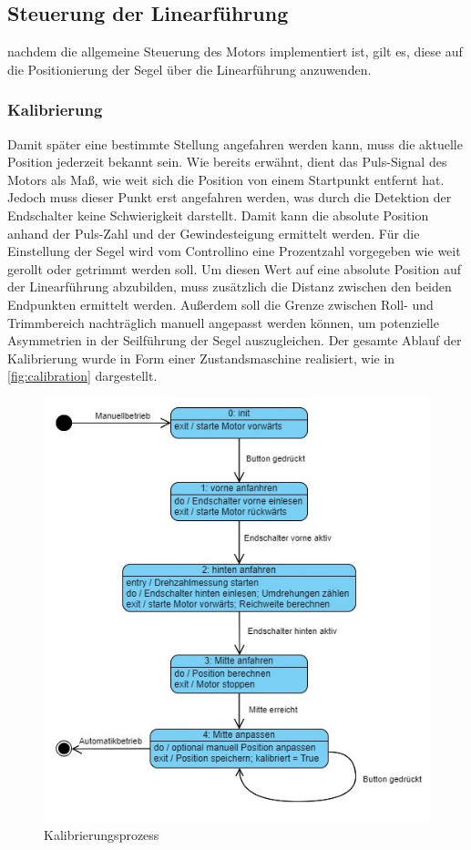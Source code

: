 \subsection{Steuerung der Linearführung}
nachdem die allgemeine Steuerung des Motors implementiert ist, gilt es, diese auf die Positionierung der Segel über die Linearführung anzuwenden. 
\subsubsection{Kalibrierung}\label{subsubsec:Kalibrierung}
Damit später eine bestimmte Stellung angefahren werden kann, muss die aktuelle Position jederzeit bekannt sein. Wie bereits erwähnt, dient das Puls-Signal des Motors als Maß, wie weit sich die Position von einem Startpunkt entfernt hat. Jedoch muss dieser Punkt erst angefahren werden, was durch die Detektion der Endschalter keine Schwierigkeit darstellt. Damit kann die absolute Position anhand der Puls-Zahl und der Gewindesteigung ermittelt werden. Für die Einstellung der Segel wird vom Controllino eine Prozentzahl vorgegeben wie weit gerollt oder getrimmt werden soll. Um diesen Wert auf eine absolute Position auf der Linearführung abzubilden, muss zusätzlich die Distanz zwischen den beiden Endpunkten ermittelt werden. Außerdem soll die Grenze zwischen Roll- und Trimmbereich nachträglich manuell angepasst werden können, um potenzielle Asymmetrien in der Seilführung der Segel auszugleichen. Der gesamte Ablauf der Kalibrierung wurde in Form einer Zustandsmaschine realisiert, wie in \autoref{fig:calibration} dargestellt.
\begin{figure}[H]
	\centering
	\includegraphics[width=0.8\linewidth]{images/Software/Kalibrierungsprozess.jpg}
	\caption{Kalibrierungsprozess}
	\label{fig:calibration}
\end{figure}
